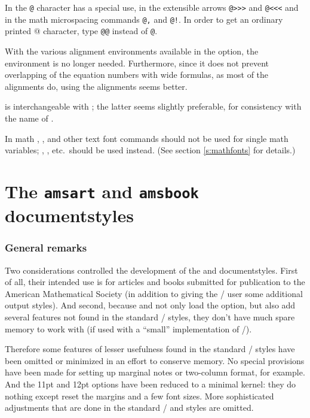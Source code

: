 In  the \verb"@" character has a special use, in the extensible
arrows \verb"@>>>" and \verb"@<<<" and in the math microspacing commands
\verb"@," and \verb"@!".  In order to get an ordinary printed @
character, type \verb"@@" instead of \verb"@".

With the various alignment environments available in the 
option, the  environment is no longer needed.  Furthermore,
since it does not prevent overlapping of the equation numbers with wide
formulas, as most of the  alignments do, using the
 alignments seems better.

 is interchangeable with ; the
latter seems slightly preferable, for consistency with the name of .

In math , , and other text font commands
should not be used for single math variables; ,
, etc.\ should be used instead.
(See section \ref{s:mathfonts} for details.)

\newpage
\part{The {\tt amsart} and {\tt amsbook} documentstyles}
\label{artbook}

\section{General remarks}

Two considerations controlled the development of the  and
 documentstyles.   First of all, their intended use is
for articles and books submitted for publication to the American
Mathematical Society (in addition to giving the \latex/ user some additional
output styles).  And second, because  and
 not only load the  option, but also add
several features not found in the standard \latex/ styles, they don't
have much spare memory to work with (if used with a ``small''
implementation of \tex/).

Therefore some features of lesser usefulness found in the standard
\latex/ styles have been omitted or minimized in an effort to conserve
memory. No special provisions have been made for setting up marginal
notes or two-column format, for example. And the 11pt and 12pt options
have been reduced to a minimal kernel: they do nothing except reset
the margins and a few font sizes. More sophisticated adjustments that
are done in the standard \latex/  and  styles
are omitted.

